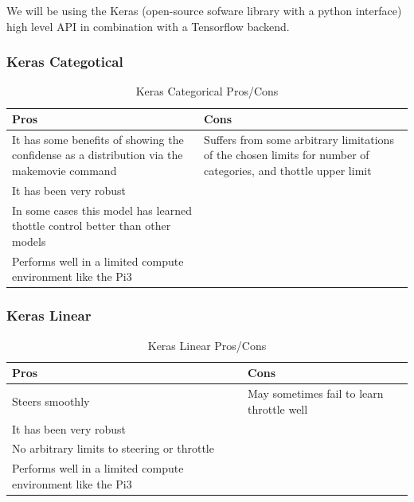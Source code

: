 We will be using the Keras (open-source sofware library with a python interface) high level API in combination with a Tensorflow backend.\\ 

\subsubsection*{Keras Categotical}

\begin{table}[!h]
\begin{center}
\begin{tabular}{|p{6cm}|p{6cm}|}
\hline
\textbf{Pros} & \textbf{Cons}\\
\hline
It has some benefits of showing the confidense as a distribution via the makemovie command & Suffers from some arbitrary limitations of the chosen limits for number of categories, and thottle upper limit \\
\hline
It has been very robust & \\
\hline
In some cases this model has learned thottle control better than other models & \\
\hline
Performs well in a limited compute environment like the Pi3 & \\
\hline
\end{tabular}
\end{center}
\caption{Keras Categorical Pros/Cons}
\end{table}



\subsubsection*{Keras Linear}

\begin{table}[!h]
\begin{center}
\begin{tabular}{|p{6cm}|p{6cm}|}
\hline
\textbf{Pros} & \textbf{Cons}\\
\hline
Steers smoothly & May sometimes fail to learn throttle well \\
\hline
It has been very robust & \\
\hline
No arbitrary limits to steering or throttle  & \\
\hline
Performs well in a limited compute environment like the Pi3 & \\
\hline
\end{tabular}
\end{center}
\caption{Keras Linear Pros/Cons}
\end{table}


